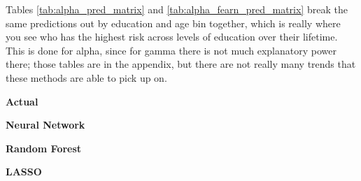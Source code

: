 \documentclass[12pt]{article}
\begin{document}
\begin{onehalfspace}
Tables \ref{tab:alpha_pred_matrix} and \ref{tab:alpha_fearn_pred_matrix} break the same predictions out by education and age bin together, which is really where you see who has the highest risk across levels of education over their lifetime. This is done for alpha, since for gamma there is not much explanatory power there; those tables are in the appendix, but there are not really many trends that these methods are able to pick up on.

\begin{table}[H]
    \centering
    \caption{Mean Predicted Alpha by Education and Age Bin, Hourly Earnings}
    \label{tab:alpha_pred_matrix}
    \begin{minipage}[t]{0.48\textwidth}
        \centering
        \textbf{Actual}\\[4pt]
        \resizebox{\linewidth}{!}{%
            
        }
    \end{minipage}\hfill
    \begin{minipage}[t]{0.48\textwidth}
        \centering
        \textbf{Neural Network}\\[4pt]
        \resizebox{\linewidth}{!}{%
            
        }
    \end{minipage}

    \vspace{10pt}

    \begin{minipage}[t]{0.48\textwidth}
        \centering
        \textbf{Random Forest}\\[4pt]
        \resizebox{\linewidth}{!}{%
            
        }
    \end{minipage}\hfill
    \begin{minipage}[t]{0.48\textwidth}
        \centering
        \textbf{LASSO}\\[4pt]
        \resizebox{\linewidth}{!}{%
            
        }
    \end{minipage}
\end{table}


\end{onehalfspace}
\end{document}

